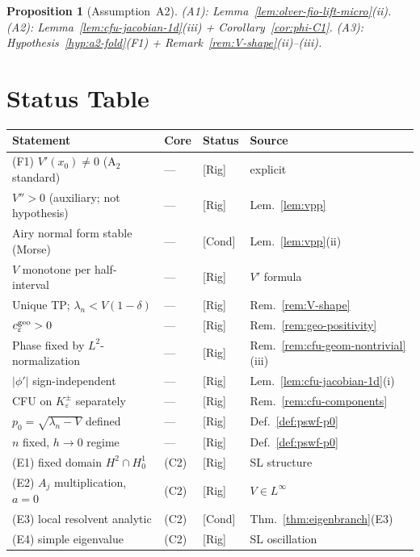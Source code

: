 \documentclass[12pt,a4paper]{amsart}
\newtheorem{proposition}[theorem]{Proposition}
\theoremstyle{definition}
\theoremstyle{remark}
\newcommand{\Rig}{\textup{[Rig]}}
\newcommand{\Cond}{\textup{[Cond]}}
\begin{document}
\begin{proposition}[Assumption~A2]
\label{prop:a2-from-lemmas}
(A1): Lemma~\ref{lem:olver-fio-lift-micro}(ii).
(A2): Lemma~\ref{lem:cfu-jacobian-1d}(iii) + Corollary~\ref{cor:phi-C1}.
(A3): Hypothesis~\ref{hyp:a2-fold}(F1) + Remark~\ref{rem:V-shape}(ii)--(iii).
\end{proposition}

\section{Status Table}
\label{sec:status}

\begin{center}
\small
\begin{tabular}{lllp{3.5cm}}
\hline
Statement & Core & Status & Source \\
\hline
(F1) $V'(x_0)\ne 0$ (A$_2$ standard) & --- & \Rig & explicit \\
$V''>0$ (auxiliary; not hypothesis) & --- & \Rig & Lem.~\ref{lem:vpp} \\
Airy normal form stable (Morse) & --- & \Cond & Lem.~\ref{lem:vpp}(ii) \\
$V$ monotone per half-interval & --- & \Rig & $V'$ formula \\
Unique TP; $\lambda_n<V(1-\delta)$ & --- & \Rig & Rem.~\ref{rem:V-shape} \\
$c_\varepsilon^{\rm geo}>0$ & --- & \Rig & Rem.~\ref{rem:geo-positivity} \\
Phase fixed by $L^2$-normalization & --- & \Rig & Rem.~\ref{rem:cfu-geom-nontrivial}(iii) \\
$|\phi'|$ sign-independent & --- & \Rig & Lem.~\ref{lem:cfu-jacobian-1d}(i) \\
CFU on $K_\varepsilon^\pm$ separately & --- & \Rig & Rem.~\ref{rem:cfu-components} \\
$p_0=\sqrt{\lambda_n-V}$ defined & --- & \Rig & Def.~\ref{def:pswf-p0} \\
$n$ fixed, $h\to 0$ regime & --- & \Rig & Def.~\ref{def:pswf-p0} \\
(E1) fixed domain $H^2\cap H^1_0$ & (C2) & \Rig & SL structure \\
(E2) $A_j$ multiplication, $a=0$ & (C2) & \Rig & $V\in L^\infty$ \\
(E3) local resolvent analytic & (C2) & \Cond & Thm.~\ref{thm:eigenbranch}(E3) \\
(E4) simple eigenvalue & (C2) & \Rig & SL oscillation \\

\end{tabular}
\end{center}
\end{document}

